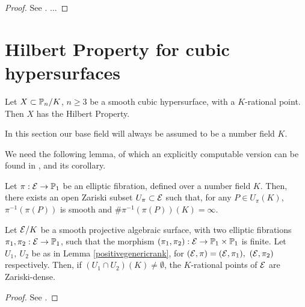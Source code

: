 \documentclass[a4paper,12pt]{article}
\begin{document}
\begin{proof}
	See \cite{myarticle1}. ...
\end{proof}



\section{Hilbert Property for cubic hypersurfaces}

\begin{theorem}\label{cubiche}
	Let $X\subset \P_n/K$, $n \geq 3$ be a smooth cubic hypersurface, with a $K$-rational point. Then $X$ has the Hilbert Property.
\end{theorem}
 In this section our base field will always be assumed to be a number field $K$.

We need the following lemma, of which an explicitly computable version can be found in \cite{RonaldvanLuijk2012}, and its corollary.

\begin{lemma}\label{positivegenericrank}
	Let $\pi:\Eps \rightarrow \P_1$ be an elliptic fibration, defined over a number field $K$. Then, there exists an open Zariski subset $U_{\pi} \subset \Eps$ such that, for any $P \in U_{\pi}(K)$, $\pi^{-1}(\pi(P))$ is smooth and $\#{\pi^{-1}(\pi(P))(K)}=\infty$. 
\end{lemma}

\begin{corollary}\label{zariskidensi}
	Let $\Eps/K$ be a smooth projective algebraic surface, with two elliptic fibrations $\pi_1,\pi_2:\Eps \rightarrow \P_1$, such that the morphism $(\pi_1,\pi_2):\Eps \rightarrow \P_1 \times \P_1$ is finite. Let $U_1, \ U_2$ be as in Lemma \ref{positivegenericrank}, for $(\Eps,\pi)=(\Eps,\pi_1), \ (\Eps, \pi_2)$ respectively. Then, if $(U_1\cap U_2)(K)\neq \emptyset$, the $K$-rational points of $\Eps$ are Zariski-dense.
\end{corollary}
\begin{proof}
	See \cite[...]{myarticle1}.
\end{proof}	
\end{document}
